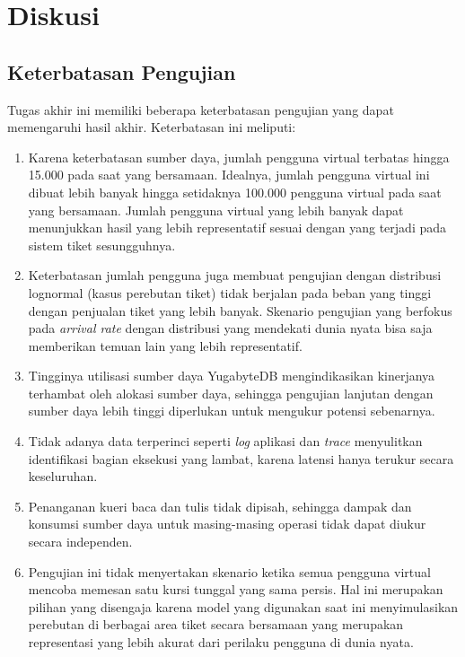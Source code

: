 \section{Diskusi}

\subsection{Keterbatasan Pengujian}
\label{keterbatasan-pengujian}

Tugas akhir ini memiliki beberapa keterbatasan pengujian yang dapat memengaruhi hasil akhir. Keterbatasan ini meliputi:

\begin{enumerate}
    \item Karena keterbatasan sumber daya, jumlah pengguna virtual terbatas hingga 15.000 pada saat yang bersamaan. Idealnya, jumlah pengguna virtual ini dibuat lebih banyak hingga setidaknya 100.000 pengguna virtual pada saat yang bersamaan. Jumlah pengguna virtual yang lebih banyak dapat menunjukkan hasil yang lebih representatif sesuai dengan yang terjadi pada sistem tiket sesungguhnya.
    \item Keterbatasan jumlah pengguna juga membuat pengujian dengan distribusi lognormal (kasus perebutan tiket) tidak berjalan pada beban yang tinggi dengan penjualan tiket yang lebih banyak. Skenario pengujian yang berfokus pada \textit{arrival rate} dengan distribusi yang mendekati dunia nyata bisa saja memberikan temuan lain yang lebih representatif.
    \item Tingginya utilisasi sumber daya YugabyteDB mengindikasikan kinerjanya terhambat oleh alokasi sumber daya, sehingga pengujian lanjutan dengan sumber daya lebih tinggi diperlukan untuk mengukur potensi sebenarnya.
    \item Tidak adanya data terperinci seperti \textit{log} aplikasi dan \textit{trace} menyulitkan identifikasi bagian eksekusi yang lambat, karena latensi hanya terukur secara keseluruhan.
    \item Penanganan kueri baca dan tulis tidak dipisah, sehingga dampak dan konsumsi sumber daya untuk masing-masing operasi tidak dapat diukur secara independen.
    \item Pengujian ini tidak menyertakan skenario ketika semua pengguna virtual mencoba memesan satu kursi tunggal yang sama persis. Hal ini merupakan pilihan yang disengaja karena model yang digunakan saat ini menyimulasikan perebutan di berbagai area tiket secara bersamaan yang merupakan representasi yang lebih akurat dari perilaku pengguna di dunia nyata.
\end{enumerate}

